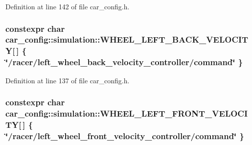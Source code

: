 Definition at line 142 of file car\+\_\+config.\+h.

\subsubsection[{\texorpdfstring{W\+H\+E\+E\+L\+\_\+\+L\+E\+F\+T\+\_\+\+B\+A\+C\+K\+\_\+\+V\+E\+L\+O\+C\+I\+TY}{WHEEL_LEFT_BACK_VELOCITY}}]{\setlength{\rightskip}{0pt plus 5cm}constexpr char car\+\_\+config\+::simulation\+::\+W\+H\+E\+E\+L\+\_\+\+L\+E\+F\+T\+\_\+\+B\+A\+C\+K\+\_\+\+V\+E\+L\+O\+C\+I\+TY\mbox{[}$\,$\mbox{]} \{ \char`\"{}/racer/left\+\_\+wheel\+\_\+back\+\_\+velocity\+\_\+controller/command\char`\"{} \}}\hypertarget{namespacecar__config_1_1simulation_ad5b5204b67d98be9a93418b41f9c5e1e}{}\label{namespacecar__config_1_1simulation_ad5b5204b67d98be9a93418b41f9c5e1e}


Definition at line 137 of file car\+\_\+config.\+h.

\subsubsection[{\texorpdfstring{W\+H\+E\+E\+L\+\_\+\+L\+E\+F\+T\+\_\+\+F\+R\+O\+N\+T\+\_\+\+V\+E\+L\+O\+C\+I\+TY}{WHEEL_LEFT_FRONT_VELOCITY}}]{\setlength{\rightskip}{0pt plus 5cm}constexpr char car\+\_\+config\+::simulation\+::\+W\+H\+E\+E\+L\+\_\+\+L\+E\+F\+T\+\_\+\+F\+R\+O\+N\+T\+\_\+\+V\+E\+L\+O\+C\+I\+TY\mbox{[}$\,$\mbox{]} \{ \char`\"{}/racer/left\+\_\+wheel\+\_\+front\+\_\+velocity\+\_\+controller/command\char`\"{} \}}\hypertarget{namespacecar__config_1_1simulation_a13f0760806f194b285a499947ec01ae3}{}\label{namespacecar__config_1_1simulation_a13f0760806f194b285a499947ec01ae3}


